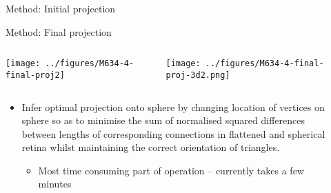 \documentclass[final,hyperref={pdfpagelabels=false}]{beamer}
\begin{document}
\begin{frame}{}
\begin{columns}[T]
\begin{column}{.33\linewidth}
\begin{block}{Method: Initial projection}
      \end{block}

      \begin{block}{Method: Final projection}
        \begin{columns}
          \begin{column}{0.38\linewidth}
            \texttt{[image: ../figures/M634-4-final-proj2]}
          \end{column}
          \begin{column}{0.5\linewidth}
            \texttt{[image: ../figures/M634-4-final-proj-3d2.png]}


          \end{column}
        \end{columns}

            \begin{itemize}
            \item Infer optimal projection onto sphere by changing
              location of vertices on sphere so as to minimise the sum
              of normalised squared differences between lengths of
              corresponding connections in flattened and spherical
              retina whilst maintaining the correct orientation of
              triangles.
              \begin{itemize}
              \item Most time consuming part of operation -- currently
                takes a few minutes
              \end{itemize}
            \end{itemize}

      \end{block}
    \end{column}

    \begin{column}{.33\linewidth}


\end{column}
\end{columns}
\end{frame}
\end{document}
